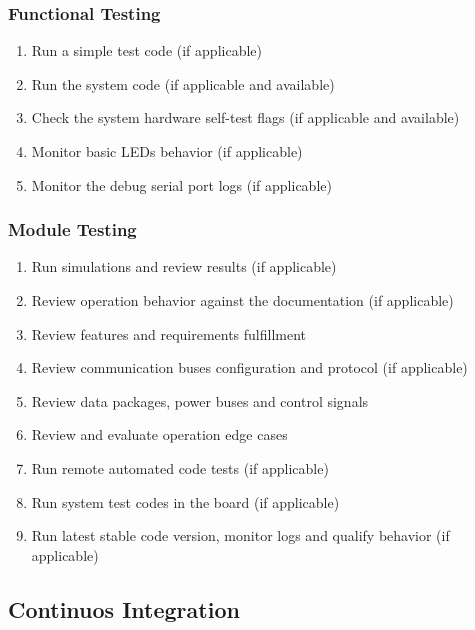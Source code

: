 \subsubsection{Functional Testing}
\begin{enumerate} \setlength\itemsep{-0.3em}
    \item Run a simple test code (if applicable) 
    \item Run the system code (if applicable and available) 
    \item Check the system hardware self-test flags (if applicable and available) 
    \item Monitor basic LEDs behavior (if applicable) 
    \item Monitor the debug serial port logs (if applicable)
\end{enumerate}

\subsubsection{Module Testing}
\begin{enumerate} \setlength\itemsep{-0.3em}
    \item Run simulations and review results (if applicable)
    \item Review operation behavior against the documentation (if applicable)
    \item Review features and requirements fulfillment
    \item Review communication buses configuration and protocol (if applicable)
    \item Review data packages, power buses and control signals
    \item Review and evaluate operation edge cases
    \item Run remote automated code tests (if applicable)
    \item Run system test codes in the board (if applicable)
    \item Run latest stable code version, monitor logs and qualify behavior (if applicable)
\end{enumerate}


\subsection{Continuos Integration}

